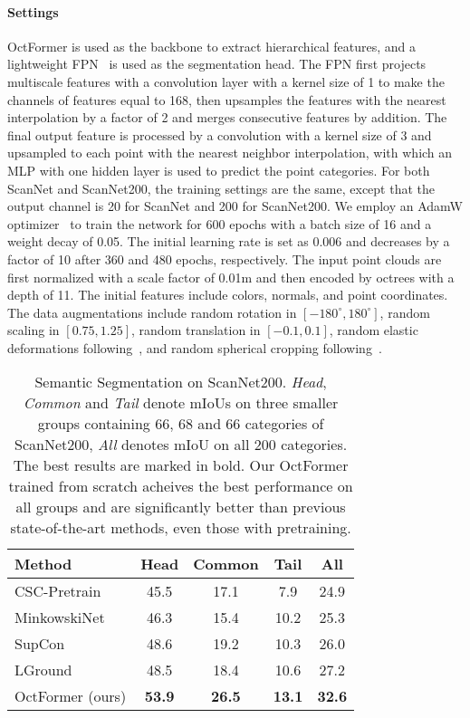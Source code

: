 \documentclass[acmtog,screen,authorversion]{acmart}
\newcommand{\tablestyle}[2]{\setlength{\tabcolsep}{#1}
                            \renewcommand{\arraystretch}{#2}
                            \centering
                            \footnotesize}
\begin{document}
\paragraph{Settings}
OctFormer is used as the backbone to extract hierarchical features, and a lightweight FPN~\cite{Lin2017} is used as the segmentation head.
The FPN first projects multiscale features with a convolution layer with a kernel size of 1 to make the channels of features equal to 168, then upsamples the features with the nearest interpolation by a factor of 2 and merges consecutive features by addition.
The final output feature is processed by a convolution with a kernel size of 3 and upsampled to each point with the nearest neighbor interpolation, with which
an MLP with one hidden layer is used to predict the point categories.
For both ScanNet and ScanNet200, the training settings are the same, except that the output channel is 20 for ScanNet and 200 for ScanNet200.
We employ an AdamW optimizer~\cite{Loshchilov2017} to train the network for 600 epochs with a batch size of 16 and a weight decay of 0.05.
The initial learning rate is set as 0.006 and decreases by a factor of 10 after 360 and 480 epochs, respectively.
The input point clouds are first normalized with a scale factor of 0.01m and then encoded by octrees with a depth of 11.
The initial features include colors, normals, and point coordinates.
The data augmentations include random rotation in $[-180^\circ, 180^\circ]$, random scaling in $[0.75, 1.25]$, random translation in $[-0.1, 0.1]$, random elastic deformations following~\cite{Choy2019}, and random spherical cropping following~\cite{Lai2022}.


\begin{table}[t]
\centering
\tablestyle{6pt}{1.1}
\caption{Semantic Segmentation on ScanNet200. \emph{Head}, \emph{Common} and \emph{Tail} denote mIoUs on three smaller groups containing 66, 68 and 66 categories of ScanNet200, \emph{All} denotes mIoU on all 200 categories. The best results are marked in bold. Our OctFormer trained from scratch acheives the best performance on all groups and are significantly better than previous state-of-the-art methods, even those with pretraining.}
\begin{tabular}{l|ccc|c}
  \toprule
  Method                           & Head       & Common     & Tail        & All       \\
  \midrule
  CSC-Pretrain~\cite{Hou2021}      & 45.5       & 17.1       & 7.9         & 24.9      \\
  MinkowskiNet~\cite{Choy2019}     & 46.3       & 15.4       & 10.2        & 25.3      \\
  SupCon~\cite{Khosla2020}         & 48.6       & 19.2       & 10.3        & 26.0      \\
  LGround~\cite{Rozen2022}         & 48.5       & 18.4       & 10.6        & 27.2      \\
  OctFormer (ours)                 & \bf{53.9}	& \bf{26.5}  & \bf{13.1}   & \bf{32.6} \\
  \bottomrule
\end{tabular}
\label{tab:scannet200}
\end{table}
 
\end{document}

